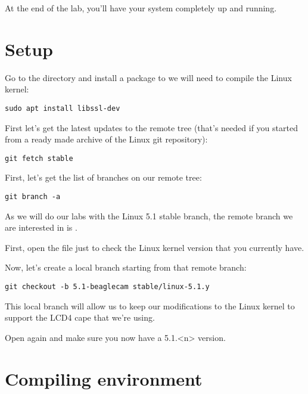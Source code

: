
At the end of the lab, you'll have your system completely up and
running.

\section{Setup}

Go to the  directory and install a
package to we will need to compile the Linux kernel:

\begin{verbatim}
sudo apt install libssl-dev
\end{verbatim}

First let's get the latest updates to the remote  tree
(that's needed if you started from a ready made archive of the Linux git
repository):

\begin{verbatim}
git fetch stable
\end{verbatim}

First, let's get the list of branches on our  remote tree:

\begin{verbatim}
git branch -a
\end{verbatim}

As we will do our labs with the Linux 5.1 stable branch, the remote branch
we are interested in is .

First, open the  file just to check the Linux kernel
version that you currently have.

Now, let's create a local branch starting from that remote branch:
\begin{verbatim}
git checkout -b 5.1-beaglecam stable/linux-5.1.y
\end{verbatim}

This local branch will allow us to keep our modifications to the Linux
kernel to support the LCD4 cape that we're using.

Open  again and make sure you now have a 5.1.<n> version.

\section{Compiling environment}

